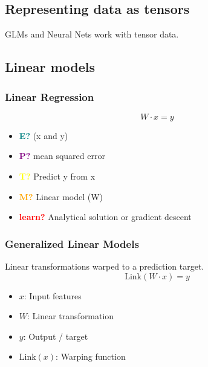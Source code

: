 \subsection{Representing data as tensors}
\begin{definition}
    GLMs and Neural Nets work with tensor data.
\end{definition}

\subsection{Linear models}
\subsubsection{Linear Regression}
\begin{definition} 
    \begin{equation}
        W \cdot x = y
    \end{equation}
    \begin{itemize}
        \item \textcolor{teal}{\textbf{E?}} (x and y)
        \item \textcolor{purple}{\textbf{P?}} mean squared error
        \item \textcolor{yellow}{\textbf{T?}} Predict y from x
        \item \textcolor{orange}{\textbf{M?}} Linear model (W)
        \item \textcolor{red}{\textbf{learn?}} Analytical solution or gradient descent
    \end{itemize}
\end{definition}

\subsubsection{Generalized Linear Models}
\begin{definition} 
    Linear transformations warped to a prediction target.
    \begin{equation}
        \text{Link}(W \cdot x) = y
    \end{equation}
    \begin{itemize}
        \item $x$: Input features
        \item $W$: Linear transformation
        \item $y$: Output / target
        \item $\text{Link}(x)$: Warping function
    \end{itemize}
\end{definition}


